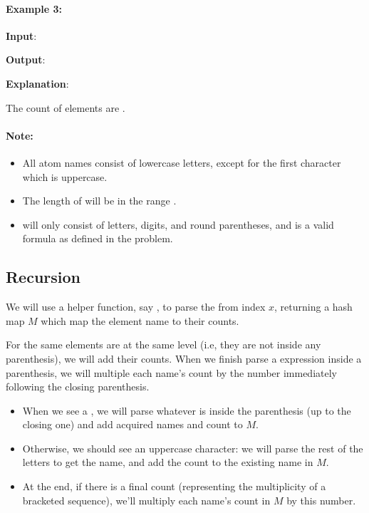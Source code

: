 \paragraph{Example 3:}

\begin{flushleft}
\textbf{Input}: 

\textbf{Output}: 

\textbf{Explanation}: 

The count of elements are \fcj{['K': 4, 'N': 2, 'O': 14, 'S': 4]}.
\end{flushleft}

\paragraph{Note:}

\begin{itemize}
\item All atom names consist of lowercase letters, except for the first character which is uppercase.
\item The length of  will be in the range \fcj{[1, 1000]}.
\item {} will only consist of letters, digits, and round parentheses, and is a valid formula as defined in the problem.
\end{itemize}

\subsection{Recursion}
We will use a helper function, say , to parse the  from index $x$, returning a hash map $M$ which map the element name to their counts.

For the same elements are at the same level (i.e, they are not inside any parenthesis), we will add their counts. When we finish parse a expression inside a parenthesis, we will multiple each name's count by the number immediately following the closing parenthesis.

\begin{itemize}
\item When we see a , we will parse whatever is inside the parenthesis (up to the closing one) and add acquired names and count to $M$.
\item Otherwise, we should see an uppercase character: we will parse the rest of the letters to get the name, and add the count to the existing name in $M$.
\item At the end, if there is a final count (representing the multiplicity of a bracketed sequence), we'll multiply each name's count in $M$ by this number.
\end{itemize}

